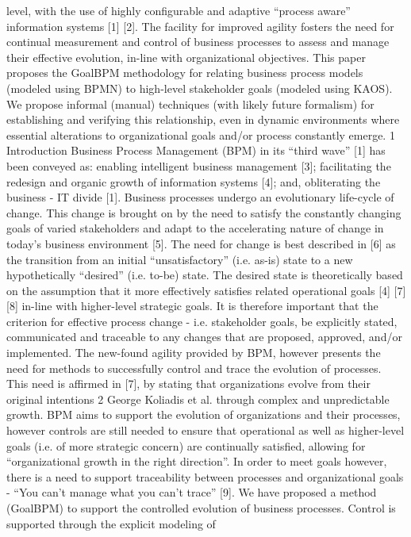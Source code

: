 level, with the use of highly configurable and adaptive “process aware”
information systems [1] [2]. The facility for improved agility fosters the
need for continual measurement and control of business processes to
assess and manage their effective evolution, in-line with organizational
objectives. This paper proposes the GoalBPM methodology for relating
business process models (modeled using BPMN) to high-level stakeholder
goals (modeled using KAOS). We propose informal (manual) techniques
(with likely future formalism) for establishing and verifying this relationship, even in dynamic environments where essential alterations to
organizational goals and/or process constantly emerge.
1 Introduction
Business Process Management (BPM) in its “third wave” [1] has been conveyed
as: enabling intelligent business management [3]; facilitating the redesign and
organic growth of information systems [4]; and, obliterating the business - IT
divide [1]. Business processes undergo an evolutionary life-cycle of change. This
change is brought on by the need to satisfy the constantly changing goals of
varied stakeholders and adapt to the accelerating nature of change in today’s
business environment [5]. The need for change is best described in [6] as the
transition from an initial “unsatisfactory” (i.e. as-is) state to a new hypothetically “desired” (i.e. to-be) state. The desired state is theoretically based on the
assumption that it more effectively satisfies related operational goals [4] [7] [8]
in-line with higher-level strategic goals. It is therefore important that the criterion for effective process change - i.e. stakeholder goals, be explicitly stated,
communicated and traceable to any changes that are proposed, approved, and/or
implemented.
The new-found agility provided by BPM, however presents the need for methods to successfully control and trace the evolution of processes. This need is affirmed in [7], by stating that organizations evolve from their original intentions
2 George Koliadis et al.
through complex and unpredictable growth. BPM aims to support the evolution
of organizations and their processes, however controls are still needed to ensure
that operational as well as higher-level goals (i.e. of more strategic concern) are
continually satisfied, allowing for “organizational growth in the right direction”.
In order to meet goals however, there is a need to support traceability between
processes and organizational goals - “You can’t manage what you can’t trace”
[9].
We have proposed a method (GoalBPM) to support the controlled evolution of business processes. Control is supported through the explicit modeling of

